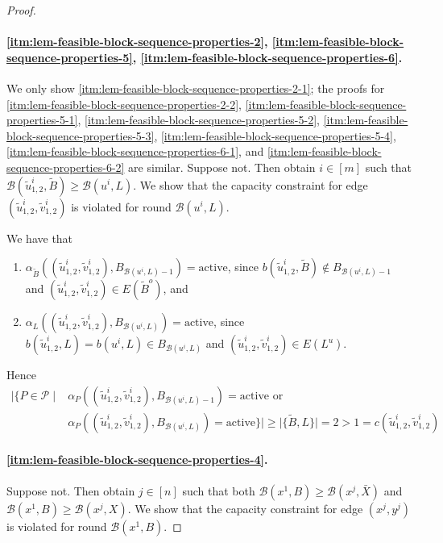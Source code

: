 \documentclass[fontsize=11pt,paper=a4]{book}
\begin{document}
\begin{proof}
\paragraph{\ref{itm:lem-feasible-block-sequence-properties-2}, \ref{itm:lem-feasible-block-sequence-properties-5}, \ref{itm:lem-feasible-block-sequence-properties-6}.}
We only show \ref{itm:lem-feasible-block-sequence-properties-2-1}; the proofs for \ref{itm:lem-feasible-block-sequence-properties-2-2}, \ref{itm:lem-feasible-block-sequence-properties-5-1}, \ref{itm:lem-feasible-block-sequence-properties-5-2}, \ref{itm:lem-feasible-block-sequence-properties-5-3}, \ref{itm:lem-feasible-block-sequence-properties-5-4}, \ref{itm:lem-feasible-block-sequence-properties-6-1}, and \ref{itm:lem-feasible-block-sequence-properties-6-2} are similar.
Suppose not.
Then obtain \(i\in[m]\) such that \(\mathcal{B}(\tilde{u}_{1,2}^i,\tilde{B})\geq\mathcal{B}(u^i,L)\).
We show that the capacity constraint for edge \((\tilde{u}_{1,2}^i,\tilde{v}_{1,2}^i)\) is violated for round \(\mathcal{B}(u^i,L)\).

We have that

\begin{enumerate}
\item \(\alpha_{\tilde{B}}((\tilde{u}_{1,2}^i,\tilde{v}_{1,2}^i),B_{\mathcal{B}(u^i,L)-1})=\mathrm{active}\), since \(b(\tilde{u}_{1,2}^i,\tilde{B})\notin B_{\mathcal{B}(u^i,L)-1}\) and \((\tilde{u}_{1,2}^i,\tilde{v}_{1,2}^i)\in E(\tilde{B}^o)\), and

\item \(\alpha_L((\tilde{u}_{1,2}^i,\tilde{v}_{1,2}^i),B_{\mathcal{B}(u^i,L)})=\mathrm{active}\), since \(b(\tilde{u}_{1,2}^i,L)=b(u^i,L)\in B_{\mathcal{B}(u^i,L)}\) and \((\tilde{u}_{1,2}^i,\tilde{v}_{1,2}^i)\in E(L^u)\).
\end{enumerate}

Hence
\begin{align*}
\lvert\{P\in\mathcal{P}\mid&\alpha_P((\tilde{u}_{1,2}^i,\tilde{v}_{1,2}^i),B_{\mathcal{B}(u^i,L)-1})=\mathrm{active}\text{ or }\\
&\alpha_P((\tilde{u}_{1,2}^i,\tilde{v}_{1,2}^i),B_{\mathcal{B}(u^i,L)})=\mathrm{active}\}\rvert\geq\lvert\{\tilde{B},L\}\rvert=2>1=c(\tilde{u}_{1,2}^i,\tilde{v}_{1,2}^i)
\end{align*}

\paragraph{\ref{itm:lem-feasible-block-sequence-properties-4}.}
Suppose not.
Then obtain \(j\in[n]\) such that both \(\mathcal{B}(x^1,B)\geq\mathcal{B}(x^j,\bar{X})\) and \(\mathcal{B}(x^1,B)\geq\mathcal{B}(x^j,X)\).
We show that the capacity constraint for edge \((x^j,y^j)\) is violated for round \(\mathcal{B}(x^1,B)\).


\end{proof}
\end{document}

